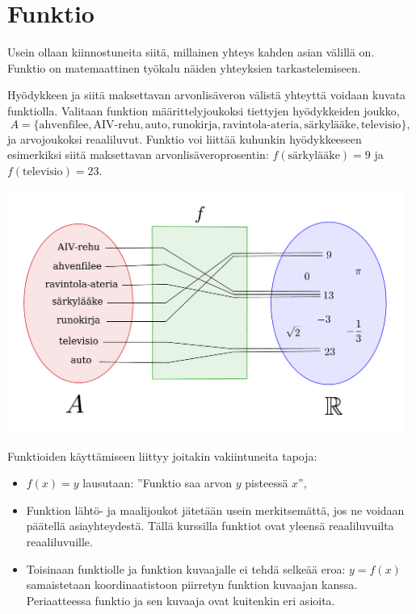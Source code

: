 \section{Funktio}

Usein ollaan kiinnostuneita siitä, millainen yhteys kahden asian välillä
on. Funktio on matemaattinen työkalu näiden yhteyksien tarkastelemiseen.


\begin{esimerkki}
Hyödykkeen ja siitä maksettavan arvonlisäveron välistä yhteyttä
voidaan kuvata funktiolla. Valitaan funktion määrittelyjoukoksi
tiettyjen hyödykkeiden joukko,
\[
A = \{\text{ahvenfilee}, \text{AIV-rehu}, \text{auto}, \text{runokirja}, \text{ravintola-ateria}, \text{särkylääke}, \text{televisio}\},
\]
ja arvojoukoksi reaaliluvut. Funktio voi liittää kuhunkin hyödykkeeseen
esimerkiksi siitä maksettavan arvonlisäveroprosentin:
$f(\text{särkylääke}) = 9$ ja $f(\text{televisio}) = 23$.

\begin{center}
\includegraphics[width=13cm]{pictures/funktiokone.pdf}
\end{center}
\end{esimerkki}

Funktioiden käyttämiseen liittyy joitakin vakiintuneita tapoja:
\begin{itemize}
\item $f(x) = y$ lausutaan: ''Funktio saa arvon $y$ pisteessä $x$'',
\item Funktion lähtö- ja maalijoukot jätetään usein merkitsemättä, jos ne voidaan päätellä asiayhteydestä. Tällä kurssilla funktiot ovat yleensä reaaliluvuilta reaaliluvuille.
\item Toisinaan funktiolle ja funktion kuvaajalle ei tehdä selkeää eroa:
$y = f(x)$ samaistetaan koordinaatistoon piirretyn funktion kuvaajan kanssa.
Periaatteessa funktio ja sen kuvaaja ovat kuitenkin eri asioita.
\end{itemize}

